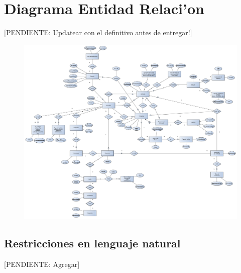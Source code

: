 \section{Diagrama Entidad Relaci'on}

[PENDIENTE: Updatear con el definitivo antes de entregar!]

\begin{figure}[H]
	\begin{center}
		\includegraphics[scale=0.2]{imagenes/DER.pdf}
	\end{center}
\end{figure}

\subsection{Restricciones en lenguaje natural}

[PENDIENTE: Agregar]